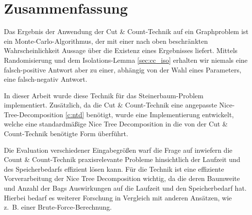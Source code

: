\chapter{Zusammenfassung}
\label{c:summary}
Das Ergebnis der Anwendung der Cut \& Count-Technik auf ein Graphproblem ist ein Monte-Carlo-Algorithmus, der mit einer nach oben beschränkten Wahrscheinlichkeit Aussage über die Existenz eines Ergebnisses liefert. Mittels Randomisierung und dem Isolations-Lemma \ref{sec:cc_iso} erhalten wir niemals eine falsch-positive Antwort aber zu einer, abhängig von der Wahl eines Parameters, eine falsch-negativ Antwort. 

In dieser Arbeit wurde diese Technik für das Steinerbaum-Problem implementiert. Zusätzlich, da die Cut \& Count-Technik eine angepasste Nice-Tree-Decomposition \ref{c:ntd} benötigt, wurde eine Implementierung entwickelt, welche eine standardmäßige Nice Tree Decomposition in die von der Cut \& Count-Technik benötigte Form überführt.

Die Evaluation verschiedener Eingabegrößen warf die Frage auf inwiefern die Count \& Count-Technik praxisrelevante Probleme hinsichtlich der Laufzeit und des Speicherbedarfs effizient lösen kann. 
Für die Technik ist eine effiziente Vorverarbeitung der Nice Tree Decomposition wichtig, da die deren Baumweite und Anzahl der Bags Auswirkungen auf die Laufzeit und den Speicherbedarf hat.
Hierbei bedarf es weiterer Forschung in Vergleich mit anderen Ansätzen, wie z.~B. einer Brute-Force-Berechnung.


